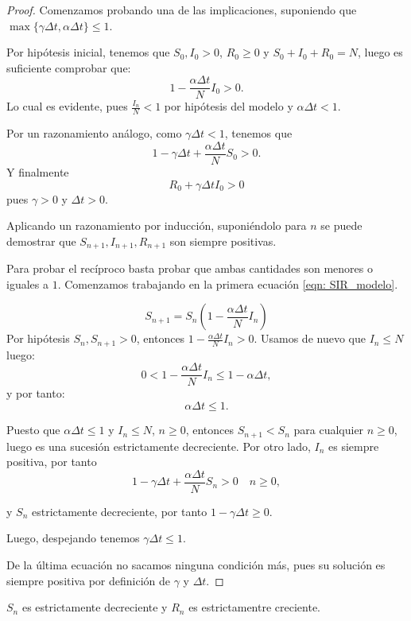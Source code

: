 \begin{proof}
Comenzamos probando una de las implicaciones, suponiendo que $\max{\big\{\gamma\Delta t, \alpha\Delta t\big\} } \leq 1$.

Por hipótesis inicial, tenemos que $S_0, I_0>0$, $R_0\geq0$ y $S_0+I_0+R_0=N$, luego es suficiente comprobar que:
$$1-\frac{\alpha \Delta t}{N}I_0>0.$$
Lo cual es evidente, pues $\frac{I_n}{N}<1$ por hipótesis del modelo y $\alpha \Delta t<1$.

Por un razonamiento análogo, como $\gamma\Delta t < 1$, tenemos que $$1-\gamma \Delta t+\frac{\alpha\Delta t}{N}S_0 > 0.$$
Y finalmente $$R_0+\gamma\Delta t I_0>0$$ pues $\gamma>0$ y $\Delta t >0$.

Aplicando un razonamiento por inducción, suponiéndolo para $n$ se puede demostrar que $S_{n+1}, I_{n+1}, R_{n+1}$ son siempre positivas.

Para probar el recíproco basta probar que ambas cantidades son menores o iguales a $1$. Comenzamos trabajando en la primera ecuación \eqref{eqn: SIR_modelo}.

$$S_{n+1}=S_n\left(1-\frac{\alpha\Delta t}{N}I_n\right)$$
Por hipótesis $S_n, S_{n+1}>0$, entonces $1-\frac{\alpha\Delta t}{N}I_n>0$. Usamos de nuevo que $I_n \leq N$ luego:
$$0<1-\frac{\alpha\Delta t}{N}I_n \leq 1-\alpha\Delta t,$$
y por tanto:
$$\alpha\Delta t  \leq 1.$$

Puesto que $\alpha\Delta t \leq 1$ y $I_n\leq N$, $n\geq 0$, entonces $S_{n+1}<S_n$ para cualquier $n\geq 0$, luego es una sucesión estrictamente decreciente. Por otro lado, $I_n$ es siempre positiva, por tanto
$$1-\gamma\Delta t+\frac{\alpha\Delta t}{N} S_n > 0 \quad n\geq 0,$$

y $S_n$ estrictamente decreciente, por tanto $1-\gamma\Delta t\geq 0$.

Luego, despejando tenemos $\gamma\Delta t \leq 1$.

De la última ecuación no sacamos ninguna condición más, pues su solución es siempre positiva por definición de $\gamma$ y $\Delta t$.

\end{proof}


\begin{lemma}
$S_n$ es estrictamente decreciente y $R_n$ es estrictamentre creciente.
\end{lemma}

